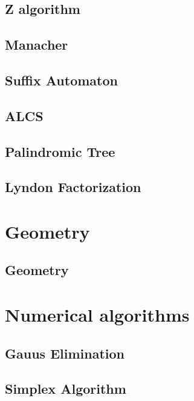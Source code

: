 \subsection{Z algorithm}
\raggedbottom
\hrulefill
\subsection{Manacher}
\raggedbottom
\hrulefill
\subsection{Suffix Automaton}
\raggedbottom
\hrulefill
\subsection{ALCS}
\raggedbottom
\hrulefill
\subsection{Palindromic Tree}
\raggedbottom
\hrulefill
\subsection{Lyndon Factorization}
\raggedbottom
\hrulefill

\section{Geometry}
\subsection{Geometry}
\raggedbottom
\hrulefill

\section{Numerical algorithms}
\subsection{Gauus Elimination}
\raggedbottom
\hrulefill
\subsection{Simplex Algorithm}
\raggedbottom
\hrulefill
